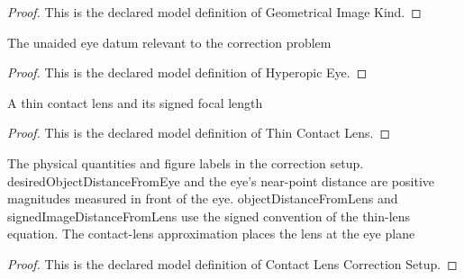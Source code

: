 \begin{proof}
  This is the declared model definition of Geometrical Image Kind.
\end{proof}
\begin{definition}
  \label{def:physics:phyx-mini-0044:phyxminiproblems-problemphyxmini0044-hyperopiceye}
  The unaided eye datum relevant to the correction problem
\end{definition}
\begin{proof}
  This is the declared model definition of Hyperopic Eye.
\end{proof}
\begin{definition}
  \label{def:physics:phyx-mini-0044:phyxminiproblems-problemphyxmini0044-thincontactlens}
  A thin contact lens and its signed focal length
\end{definition}
\begin{proof}
  This is the declared model definition of Thin Contact Lens.
\end{proof}
\begin{definition}
  \label{def:physics:phyx-mini-0044:phyxminiproblems-problemphyxmini0044-contactlenscorrectionsetup}
  The physical quantities and figure labels in the correction setup. desiredObjectDistanceFromEye and the eye's near-point distance are positive magnitudes measured in front of the eye. objectDistanceFromLens and signedImageDistanceFromLens use the signed convention of the thin-lens equation. The contact-lens approximation places the lens at the eye plane
\end{definition}
\begin{proof}
  This is the declared model definition of Contact Lens Correction Setup.
\end{proof}
